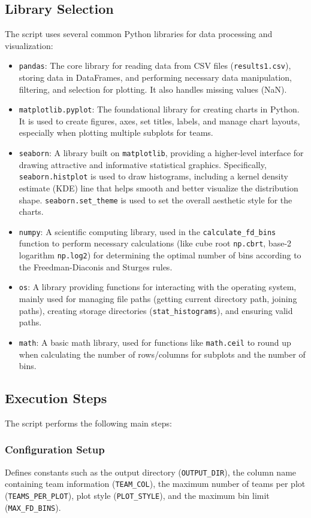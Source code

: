 \documentclass[12pt, a4paper]{report}
\begin{document}
\subsection{Library Selection}
The script uses several common Python libraries for data processing and visualization:
\begin{itemize}
    \item \texttt{pandas}: The core library for reading data from CSV files (\texttt{results1.csv}), storing data in DataFrames, and performing necessary data manipulation, filtering, and selection for plotting. It also handles missing values (NaN).
    \item \texttt{matplotlib.pyplot}: The foundational library for creating charts in Python. It is used to create figures, axes, set titles, labels, and manage chart layouts, especially when plotting multiple subplots for teams.
    \item \texttt{seaborn}: A library built on \texttt{matplotlib}, providing a higher-level interface for drawing attractive and informative statistical graphics. Specifically, \texttt{seaborn.histplot} is used to draw histograms, including a kernel density estimate (KDE) line that helps smooth and better visualize the distribution shape. \texttt{seaborn.set\_theme} is used to set the overall aesthetic style for the charts.
    \item \texttt{numpy}: A scientific computing library, used in the \texttt{calculate\_fd\_bins} function to perform necessary calculations (like cube root \texttt{np.cbrt}, base-2 logarithm \texttt{np.log2}) for determining the optimal number of bins according to the Freedman-Diaconis and Sturges rules.
    \item \texttt{os}: A library providing functions for interacting with the operating system, mainly used for managing file paths (getting current directory path, joining paths), creating storage directories (\texttt{stat\_histograms}), and ensuring valid paths.
    \item \texttt{math}: A basic math library, used for functions like \texttt{math.ceil} to round up when calculating the number of rows/columns for subplots and the number of bins.
\end{itemize}

\subsection{Execution Steps}
The script performs the following main steps:
\subsubsection*{Configuration Setup}
Defines constants such as the output directory (\texttt{OUTPUT\_DIR}), the column name containing team information (\texttt{TEAM\_COL}), the maximum number of teams per plot (\texttt{TEAMS\_PER\_PLOT}), plot style (\texttt{PLOT\_STYLE}), and the maximum bin limit (\texttt{MAX\_FD\_BINS}).
\end{document}
